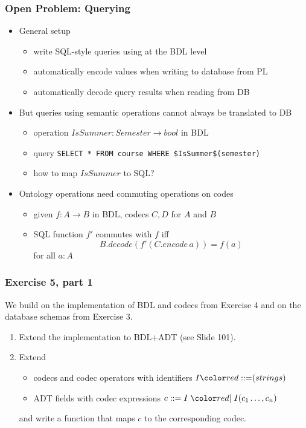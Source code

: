 \documentclass{beamer}
\begin{document}
\begin{frame}\frametitle{Open Problem: Querying}
\begin{itemize}
\item General setup
 \begin{itemize}
 \item write SQL-style queries using at the BDL level
 \item automatically encode values when writing to database from PL
 \item automatically decode query results when reading from DB
 \end{itemize}
\item But queries using semantic operations cannot always be translated to DB
 \begin{itemize}
  \item operation $IsSummer: Semester \to bool$ in BDL
  \item query \lstinline|SELECT * FROM course WHERE $IsSummer$(semester)|
  \item how to map $IsSummer$ to SQL?
 \end{itemize}
\item Ontology operations need commuting operations on codes
\begin{itemize}
\item given $f: A\to B$ in BDL, codecs $C,D$ for $A$ and $B$
\item SQL function $f'$ commutes with $f$ iff \\
  \[B.decode (f'(C.encode\,a)) = f(a)\]
  for all $a:A$
\end{itemize}
\end{itemize}
\end{frame}

\begin{frame}\frametitle{Exercise 5, part 1}
We build on the implementation of BDL and codecs from Exercise 4 and on the database schemas from Exercise 3.

\begin{enumerate}
 \item Extend the implementation to BDL+ADT (see Slide 101).
 \item Extend 
  \begin{itemize}
  \item codecs and codec operators with identifiers $I\bbc (strings)$
  \item ADT fields with codec expressions $c::=I \bnfalt I(c_1\ldots,c_n)$
  \end{itemize}
  and write a function that maps $c$ to the corresponding codec.
\end{enumerate}
\end{frame}
\end{document}

